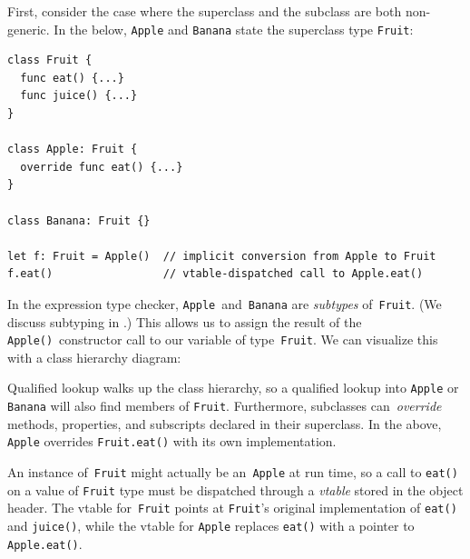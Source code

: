 \documentclass[../generics]{subfiles}
\begin{document}
\begin{example}
First, consider the case where the superclass and the subclass are both non-generic. In the below, \texttt{Apple} and \texttt{Banana} state the superclass type \texttt{Fruit}:
\begin{Verbatim}
class Fruit {
  func eat() {...}
  func juice() {...}
}

class Apple: Fruit {
  override func eat() {...}
}

class Banana: Fruit {}

let f: Fruit = Apple()  // implicit conversion from Apple to Fruit
f.eat()                 // vtable-dispatched call to Apple.eat()
\end{Verbatim}
In the expression type checker, \texttt{Apple}~and~\texttt{Banana} are \emph{subtypes} of~\texttt{Fruit}. (We discuss subtyping in .) This allows us to assign the result of the \texttt{Apple()}~constructor call to our variable of type~\texttt{Fruit}. We can visualize this with a class hierarchy diagram:
\begin{center}
\end{center}
Qualified lookup walks up the class hierarchy, so a qualified lookup into \texttt{Apple} or \texttt{Banana} will also find members of \texttt{Fruit}. Furthermore, subclasses can~\emph{override} methods, properties, and subscripts declared in their superclass. In the above, \texttt{Apple} overrides \texttt{Fruit.eat()} with its own implementation.

An instance of~\texttt{Fruit} might actually be an~\texttt{Apple} at run time, so a call to \texttt{eat()} on a value of \texttt{Fruit} type must be dispatched through a \emph{vtable} stored in the object header. The vtable for~\texttt{Fruit} points at \texttt{Fruit}'s original implementation of \texttt{eat()} and \texttt{juice()}, while the vtable for \texttt{Apple} replaces \texttt{eat()} with a pointer to \texttt{Apple.eat()}.
\end{example}
\end{document}
